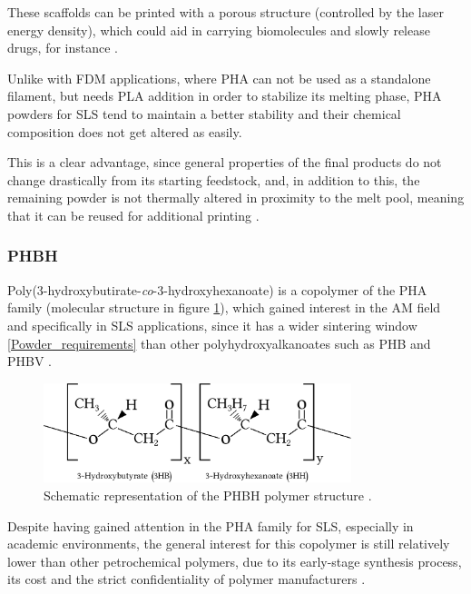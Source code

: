 \documentclass{article}
\begin{document}
    These scaffolds can be printed with a porous structure (controlled by the laser energy density), 
    which could aid in carrying biomolecules and slowly release drugs, for instance \autocites{Messori_Bondioli_PHAs}.
    
    Unlike with FDM applications, where PHA can not be used as a standalone filament, but needs PLA addition in order to stabilize its melting 
    phase, PHA powders for SLS tend to maintain a better stability and their chemical composition does not get altered as easily. 

    This is a clear advantage, since general properties of the final products do not change drastically from its starting feedstock, 
    and, in addition to this, the remaining powder is not thermally altered in proximity to the melt pool, meaning that it can 
    be reused for additional printing \autocite{Kovalcik_PHA_Review}.  \\
        
    \subsubsection{PHBH \label{PHBH}}

    Poly(3-hydroxybutirate-\textit{co}-3-hydroxyhexanoate) is a copolymer of the PHA family (molecular structure in figure \ref{fig:PHBH_structure}), which gained 
    interest in the AM field and specifically in SLS applications, since it has a wider sintering window \ref{Powder_requirements} than other polyhydroxyalkanoates
    such as PHB and PHBV \autocites{DechetMaximilianA2020OtDo}{doi:10.1063/1.4918516}. \\ 

    \begin{figure}[h!]
        \centering
        \includegraphics[width=0.8\textwidth]{Pictures/PHBH_chain.eps}
        \caption{Schematic representation of the PHBH polymer structure \autocites{PHBH,Inkscape}.}
        \label{fig:PHBH_structure}
    \end{figure}
    
    Despite having gained attention in the PHA family for SLS, especially in academic environments, the general interest for this copolymer
    is still relatively lower than other 
    petrochemical polymers, due to its early-stage synthesis process, its cost and the strict confidentiality 
    of polymer manufacturers \autocite{Eraslan_PHBH_review}.  
\end{document}
